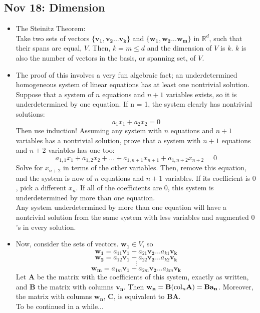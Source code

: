 \documentclass[10pt, oneside]{article}
\let\leq\leqslant
\newcommand{\foobar}[1]{}
\newcommand{\R}{\mathbb{R}}
\renewcommand{\vec}[1]{\mathbf{#1}}
\newcommand{\mat}[1]{\mathbf{#1}}
\begin{document}
\subsection{Nov 18: Dimension}
\begin{itemize}
    \item The Steinitz Theorem:\\
        Take two sets of vectors $\{\vec{v_1}, \vec{v_2} ... \vec{v_k}\}$ and $\{\vec{w_1}, \vec{w_2} ... \vec{w_m}\}$ in $\R^d$, such that their spans are equal, $V$. Then, $k = m \leq d$ and the dimension of $V$ is $k$. $k$ is also the number of vectors in the basis, or spanning set, of $V$.
    \item The proof of this involves a very fun algebraic fact; an underdetermined homogeneous system of linear equations has at least one nontrivial solution. Suppose that a system of $n$ equations and $n+1$ variables exists, so it is underdetermined by one equation. If n = 1, the system clearly has nontrivial solutions:
        \[a_1x_1 + a_2x_2 = 0\]
        Then use induction! Assuming any system with $n$ equations and $n+1$ variables has a nontrivial solution, prove that a system with $n+1$ equations and $n+2$ variables has one too:
        \[a_{1,1}x_1 + a_{1,2}x_2 + \hdots + a_{1,n+1}x_{n+1} + a_{1,n+2}x_{n+2} = 0\]
        Solve for $x_{n+2}$ in terms of the other variables. Then, remove this equation, and the system is now of $n$ equations and $n+1$ variables. If its coefficient is $0$, pick a different $x_n$. If all of the coefficients are $0$, this system is underdetermined by more than one equation.\\
        Any system underdetermined by more than one equation will have a nontrivial solution from the same system with less variables and augmented $0$'s in every solution.
    \item Now, consider the sets of vectors. $\vec{w_1} \in V$, so
        \[\vec{w_1} = a_{11}\vec{v_1} + a_{21}\vec{v_2} \hdots a_{k1}\vec{v_k}\]
        \[\vec{w_2} = a_{12}\vec{v_1} + a_{22}\vec{v_2} \hdots a_{k2}\vec{v_k}\]
        \[\vdots\]
        \[\vec{w_m} = a_{1m}\vec{v_1} + a_{2m}\vec{v_2} \hdots a_{km}\vec{v_k}\]
        Let $\mat{A}$ be the matrix with the coefficients of this system, exactly as written, and $\mat{B}$ the matrix with columns $\vec{v_n}$. Then $\vec{w_n} = \mat{B}({\rm col}_n \mat{A}) = \mat{B}\vec{a_n}$. Moreover, the matrix with columns $\vec{w_n}$, $\mat{C}$, is equivalent to $\mat{BA}$. \foobar{ $\mat{C} \in \R^{d\times m}$, and $\mat{BA} \in \R^{(d \times k)(k \times m)} = \R^{d \times m}$}\\
        To be continued in a while...
\end{itemize}
\end{document}
